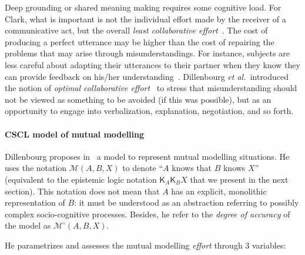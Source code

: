\documentclass{sig-alternate}
\newcommand{\etal}{{\textit{et al.~}}}
\newcommand{\model}[3]{{$\mathcal{M}(#1, #2, #3)$}}
\newcommand{\Model}[3]{{$\mathcal{M}^{\circ}(#1, #2, #3)$}}
\begin{document}
Deep grounding or shared meaning making requires some cognitive load. For Clark,
what is important is not the individual effort made by the receiver of a
communicative act, but the overall \emph{least collaborative
effort}~\cite{clark1986referring}.  The cost of producing a perfect utterance
may be higher than the cost of repairing the problems that may arise through
misunderstandings. For instance, subjects are less careful about adapting their
utterances to their partner when they know they can provide feedback on his/her
understanding~\cite{schober1993spatial}. Dillenbourg \etal introduced the
notion of \emph{optimal collaborative effort}~\cite{dillenbourg1995evolution} to
stress that misunderstanding should not be viewed as something to be avoided (if
this was possible), but as an opportunity to engage into verbalization,
explanation, negotiation, and so forth.

\paragraph{CSCL model of mutual modelling}
\label{cscl-model}

Dillenbourg proposes in~\cite{sangin2007partner} a model to represent mutual
modelling situations. He uses the notation \model{A}{B}{X} to denote ``$A$ knows
that $B$ knows $X$'' (equivalent to the epistemic logic notation
$\mathsf{K}_{A}\mathsf{K}_{B}X$ that we present in the next section). This
notation does not mean that $A$ has an explicit, monolithic representation of $B$: it
must be understood as an abstraction referring to possibly complex socio-cognitive
processes. Besides, he refer to the \emph{degree of accuracy} of the model as
\Model{A}{B}{X}.

He parametrizes and assesses the mutual modelling \emph{effort} through 3 variables:
\end{document}
